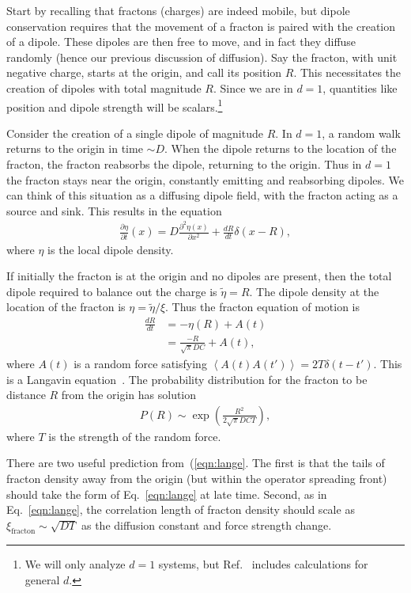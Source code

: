 \documentclass[a4paper,11pt]{article}
\newcommand{\pd}[2]{\frac{\partial #1}{\partial #2}}
\newcommand{\pdn}[3]{\frac{\partial^{#3} #1}{\partial #2^{#3}}}
\newcommand{\nd}[2]{\frac{d #1}{d #2}}
\newcommand{\ex}[1]{\left\langle #1 \right\rangle}
\newcommand{\note}[1]{{\color{red}{#1}}}
\begin{document}
Start by recalling that fractons (charges) are indeed mobile, but dipole conservation requires that the movement of a fracton is paired with the creation of a dipole. These dipoles are then free to move, and in fact they diffuse randomly (hence our previous discussion of diffusion). Say the fracton, with unit negative charge, starts at the origin, and call its position $R$. This necessitates the creation of dipoles with total magnitude $R$. Since we are in $d=1$, quantities like position and dipole strength will be scalars.\footnote{We will only analyze $d=1$ systems, but Ref.~\cite{PaiFracton} includes calculations for general $d$.}

Consider the creation of a single dipole of magnitude $R$. In $d=1$, a random walk returns to the origin in time $\sim D$.  When the dipole returns to the location of the fracton, the fracton reabsorbs the dipole, returning to the origin. Thus in $d=1$ the fracton stays near the origin, constantly emitting and reabsorbing dipoles. We can think of this situation as a diffusing dipole field, with the fracton acting as a source and sink. This results in the equation
\begin{align}
\pd{\eta}{t}(x) = D\pdn{\eta(x)}{x}{2} + \nd{R}{t}\delta(x-R),
\end{align}
where $\eta$ is the local dipole density.

If initially the fracton is at the origin and no dipoles are present, then the total dipole required to balance out the charge is $\tilde{\eta}=R$. The dipole density at the location of the fracton is $\eta = \tilde{\eta}/\xi$. Thus the fracton equation of motion is
\begin{align}
\nd{R}{t} &= -\eta(R) + A(t)\\
&= \frac{-R}{\sqrt{\pi} DC}+ A(t),
\end{align}
where $A(t)$ is a random force satisfying $\ex{A(t)A(t')} = 2T\delta(t-t')$. \note{The units are wonky here.} This is a Langavin equation~\cite{MarenduAsp}. The probability distribution for the fracton to be distance $R$ from the origin has solution
\begin{align}
P(R) \sim \exp\left(\frac{R^2}{2\sqrt{\pi}DCT}\right), \label{eqn:lange}
\end{align}
where $T$ is the strength of the random force. 

There are two useful prediction from~(\ref{eqn:lange}. The first is that the tails of fracton density away from the origin (but within the operator spreading front) should take the form of Eq.~\ref{eqn:lange} at late time. Second, as in Eq.~\ref{eqn:lange}, the correlation length of fracton density should scale as $\xi_\text{fracton}\sim \sqrt{DT}$ as the diffusion constant and force strength change. 
\end{document}

